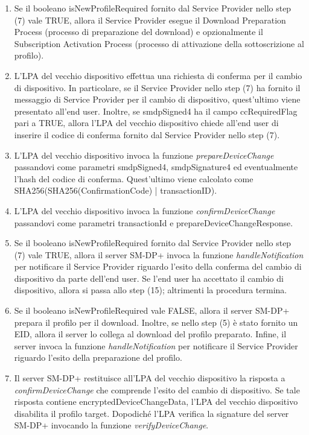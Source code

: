 \documentclass[10pt, twoside, openany]{book}
\begin{document}
\begin{enumerate}
\item Se il booleano isNewProfileRequired fornito dal Service Provider nello step (7) vale TRUE, allora il Service Provider esegue il Download Preparation Process (processo di preparazione del download) e opzionalmente il Subscription Activation Process (processo di attivazione della sottoscrizione al profilo).
\item L'LPA del vecchio dispositivo effettua una richiesta di conferma per il cambio di dispositivo. In particolare, se il Service Provider nello step (7) ha fornito il messaggio di Service Provider per il cambio di dispositivo, quest'ultimo viene presentato all'end user. Inoltre, se smdpSigned4 ha il campo ccRequiredFlag pari a TRUE, allora l'LPA del vecchio dispositivo chiede all'end user di inserire il codice di conferma fornito dal Service Provider nello step (7).
\item L'LPA del vecchio dispositivo invoca la funzione \textit{prepareDeviceChange} passandovi come parametri smdpSigned4, smdpSignature4 ed eventualmente l'hash del codice di conferma. Quest'ultimo viene calcolato come SHA256(SHA256(ConfirmationCode) | transactionID).
\item L'LPA del vecchio dispositivo invoca la funzione \textit{confirmDeviceChange} passandovi come parametri transactionId e prepareDeviceChangeResponse.
\item Se il booleano isNewProfileRequired fornito dal Service Provider nello step (7) vale TRUE, allora il server SM-DP+ invoca la funzione \textit{handleNotification} per notificare il Service Provider riguardo l'esito della conferma del cambio di dispositivo da parte dell'end user. Se l'end user ha accettato il cambio di dispositivo, allora si passa allo step (15); altrimenti la procedura termina.
\item Se il booleano isNewProfileRequired vale FALSE, allora il server SM-DP+ prepara il profilo per il download. Inoltre, se nello step (5) è stato fornito un EID, allora il server lo collega al download del profilo preparato. Infine, il server invoca la funzione \textit{handleNotification} per notificare il Service Provider riguardo l'esito della preparazione del profilo.
\item Il server SM-DP+ restituisce all'LPA del vecchio dispositivo la risposta a \textit{confirmDeviceChange} che comprende l'esito del cambio di dispositivo. Se tale risposta contiene encryptedDeviceChangeData, l'LPA del vecchio dispositivo disabilita il profilo target. Dopodiché l'LPA verifica la signature del server SM-DP+ invocando la funzione \textit{verifyDeviceChange}.

\end{enumerate}
\end{document}
